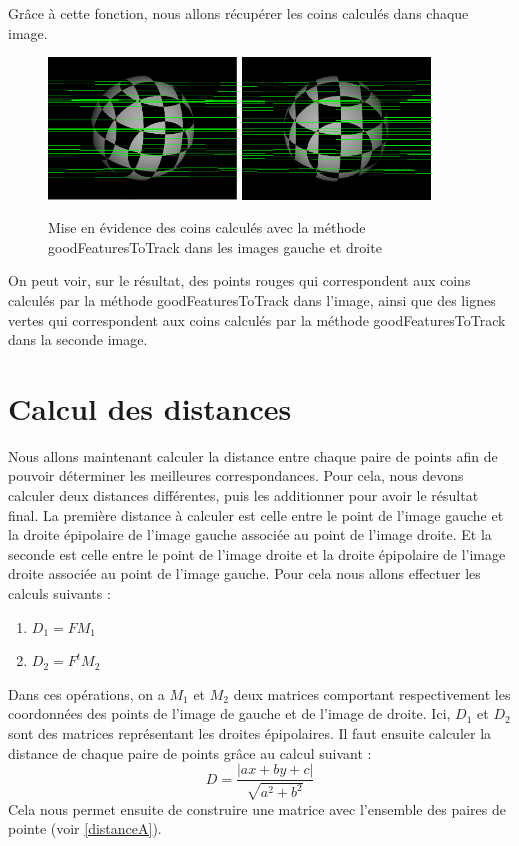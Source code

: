 \documentclass[a4paper,10pt]{article}
\begin{document}
Grâce à cette fonction, nous allons récupérer les coins calculés dans chaque image.
\begin{figure}[!h]
  \center
    \includegraphics[width=5cm]{leftR.png}
    \includegraphics[width=5cm]{rightR.png}
  \caption{Mise en évidence des coins calculés avec la méthode goodFeaturesToTrack dans les images gauche et droite}
\end{figure}
On peut voir, sur le résultat, des points rouges qui correspondent aux coins calculés par la méthode goodFeaturesToTrack
dans l'image, ainsi que des lignes vertes qui correspondent aux coins calculés par la méthode goodFeaturesToTrack dans la
seconde image.
 
\section{Calcul des distances}
Nous allons maintenant calculer la distance entre chaque paire de points afin de pouvoir déterminer
les meilleures correspondances. Pour cela, nous devons calculer deux distances différentes, puis les 
additionner pour avoir le résultat final. La première distance à calculer est celle entre le point de l'image gauche et la droite épipolaire 
de l'image gauche associée au point de l'image droite. Et la seconde est celle entre le point de l'image droite et la droite épipolaire de 
l'image droite associée au point de l'image gauche. Pour cela nous allons effectuer les calculs suivants :
\begin{enumerate}
 \item $D_1 = FM_1$
 \item $D_2 = F^tM_2$
\end{enumerate}
Dans ces opérations, on a $M_1$ et $M_2$ deux matrices comportant respectivement les coordonnées des points 
de l'image de gauche et de l'image de droite. Ici, $D_1$ et $D_2$ sont des matrices représentant les droites
épipolaires. Il faut ensuite calculer la distance de chaque paire de points grâce au calcul suivant :
\begin{equation}
 D = \frac{|ax+by+c|}{\sqrt{a^2+b^2}}
\end{equation}
Cela nous permet ensuite de construire une matrice avec l'ensemble des paires de pointe (voir \ref{distanceA}).
\end{document}
